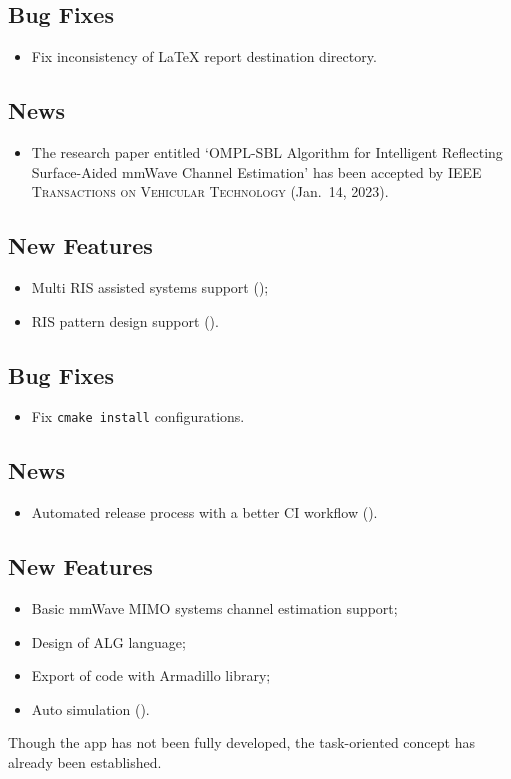 \subsection*{Bug Fixes}
\begin{itemize}
  \item Fix inconsistency of \LaTeX{} report destination directory.
\end{itemize}
\subsection*{News}
\begin{itemize}
  \item The research paper entitled `OMPL-SBL Algorithm for Intelligent Reflecting Surface-Aided mmWave Channel Estimation' has been accepted by \textsc{IEEE Transactions on Vehicular Technology} (Jan.~14, 2023).
\end{itemize}

\subsection*{New Features}
\begin{itemize}
  \item Multi RIS assisted systems support ();
  \item RIS pattern design support ().
\end{itemize}
\subsection*{Bug Fixes}
\begin{itemize}
  \item Fix \texttt{cmake install} configurations.
\end{itemize}
\subsection*{News}
\begin{itemize}
  \item Automated release process with a better CI workflow ().
\end{itemize}

\subsection*{New Features}
\begin{itemize}
  \item Basic mmWave MIMO systems channel estimation support;
  \item Design of ALG language;
  \item Export of code with Armadillo library;
  \item Auto simulation ().
\end{itemize}

Though the app has not been fully developed,
the task-oriented concept has already been established.

